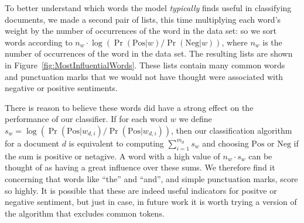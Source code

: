 \documentclass{article}
\newcommand{\PosC}{\mathrm{Pos}}
\newcommand{\NegC}{\mathrm{Neg}}
\begin{document}
To better understand which words the model \emph{typically} finds useful in classifying documents, we made a second pair of lists, this time multiplying each word's weight by the number of occurrences of the word in the data set: so we sort words according to \(n_w \cdot \log(\Pr(\PosC|w) / \Pr(\NegC|w))\), where \(n_w\) is the number of occurrences of the word in the data set.
The resulting lists are shown in Figure~\ref{fig:MostInfluentialWords}.
These lists contain many common words and punctuation marks that we would not have thought were associated with negative or positive sentiments.

There is reason to believe these words did have a strong effect on the performance of our classifier.
If for each word \(w\) we define \(s_w = \log(\Pr(\PosC|w_{d,i}) / \Pr(\PosC|w_{d,i}))\), then
our classification algorithm for a document \(d\) is equivalent to computing \(\sum_{i=1}^{m_d} s_w\) and choosing \(\PosC\) or \(\NegC\) if the sum is positive or netagive.
A word with a high value of \(n_w \cdot s_w\) can be thought of as having a great influence over these sums.
We therefore find it concerning that words like ``the'' and ``and'', and simple punctuation marks, score so highly.
It is possible that these are indeed useful indicators for positve or negative sentiment, but just in case, in future work it is worth trying a version of the algorithm that excludes common tokens.
\end{document}
